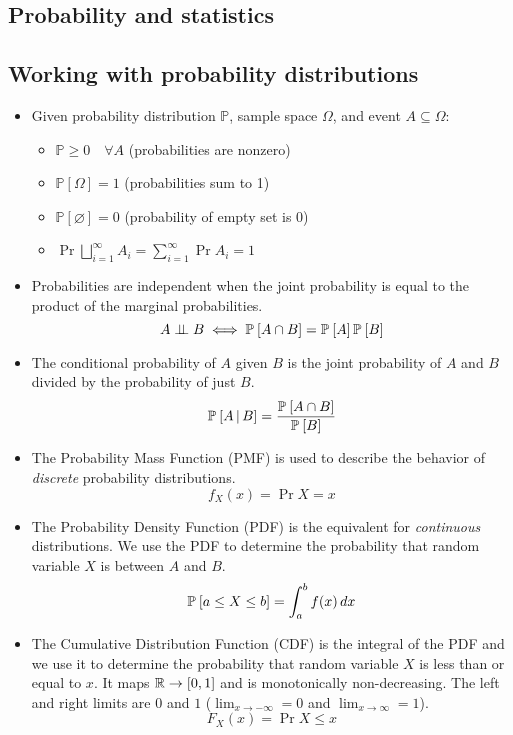 \documentclass{article}
\begin{document}
\begin{multicols*}{2}
\section{Probability and statistics}


\subsection{Working with probability distributions}
\begin{itemize}
    \item Given probability distribution $\mathbb{P}$, sample space $\Omega$, and event $A \subseteq \Omega$:
    \begin{itemize}
        \item $\mathbb{P} \geq 0 \quad \forall A$ (probabilities are nonzero)
        \item $\mathbb{P}[\Omega] = 1$ (probabilities sum to 1)
        \item $\mathbb{P}[\varnothing] = 0$ (probability of empty set is 0)
        \item $\Pr{\displaystyle\bigsqcup_{i=1}^\infty A_i}
        = \displaystyle\sum_{i=1}^\infty \Pr{A_i} = 1$
    \end{itemize}
    \item Probabilities are independent when the joint probability is equal to the product of the marginal probabilities.
    \[A \perp\!\!\!\perp B \;\Longleftrightarrow\; \mathbb{P}_{}\left[A \cap B\right] = \mathbb{P}_{}\left[A\right]\mathbb{P}_{}\left[B\right]\]

    \item The conditional probability of $A$ given $B$ is the joint probability of $A$ and $B$ divided by the probability of just $B$.
    \[\mathbb{P}_{}\left[A \,|\, B\right] = \frac{\mathbb{P}_{}\left[A \cap B\right]}{\mathbb{P}_{}\left[B\right]}\]

    \item The Probability Mass Function (PMF) is used to describe the behavior of \emph{discrete} probability distributions.
    \[f_X(x) = \Pr{X = x}\]

    \item The Probability Density Function (PDF) is the equivalent for \emph{continuous} distributions. We use the PDF to determine the probability that random variable $X$ is between $A$ and $B$.
    \[\mathbb{P}_{}\left[a \le X \le b\right] = \int_a^b f(x)\,dx\]

    \item The Cumulative Distribution Function (CDF) is the integral of the PDF and we use it to determine the probability that random variable $X$ is less than or equal to $x$. It maps $\mathbb{R} \to [0,1]$ and is monotonically non-decreasing. The left and right limits are $0$ and $1$ ($\lim_{x\to -\infty} = 0$ and $\lim_{x\to \infty} = 1$).
    \[F_X(x) = \Pr{X \le x}\]


\end{itemize}
\end{multicols*}
\end{document}
